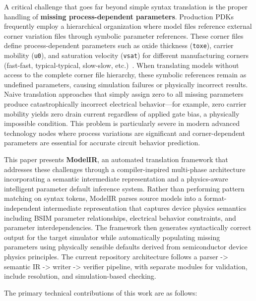 \documentclass[10pt,twocolumn]{article}
\begin{document}
A critical challenge that goes far beyond simple syntax translation is the proper handling of \textbf{missing process-dependent parameters}. Production PDKs frequently employ a hierarchical organization where model files reference external corner variation files through symbolic parameter references. These corner files define process-dependent parameters such as oxide thickness (\texttt{toxe}), carrier mobility (\texttt{u0}), and saturation velocity (\texttt{vsat}) for different manufacturing corners (fast-fast, typical-typical, slow-slow, etc.)~\cite{corner_analysis, monte_carlo}. When translating models without access to the complete corner file hierarchy, these symbolic references remain as undefined parameters, causing simulation failures or physically incorrect results. Naive translation approaches that simply assign zero to all missing parameters produce catastrophically incorrect electrical behavior---for example, zero carrier mobility yields zero drain current regardless of applied gate bias, a physically impossible condition. This problem is particularly severe in modern advanced technology nodes where process variations are significant and corner-dependent parameters are essential for accurate circuit behavior prediction.

This paper presents \textbf{ModelIR}, an automated translation framework that addresses these challenges through a compiler-inspired multi-phase architecture incorporating a semantic intermediate representation and a physics-aware intelligent parameter default inference system. Rather than performing pattern matching on syntax tokens, ModelIR parses source models into a format-independent intermediate representation that captures device physics semantics including BSIM parameter relationships, electrical behavior constraints, and parameter interdependencies. The framework then generates syntactically correct output for the target simulator while automatically populating missing parameters using physically sensible defaults derived from semiconductor device physics principles. The current repository architecture follows a parser -> semantic IR -> writer -> verifier pipeline, with separate modules for validation, include resolution, and simulation-based checking.

The primary technical contributions of this work are as follows:
\end{document}
